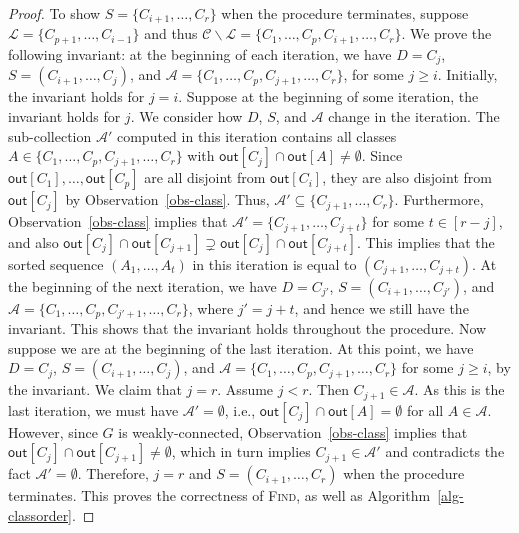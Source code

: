 \documentclass[11pt]{article}
\begin{document}
\begin{proof}
To show $S = \{C_{i+1},\dots,C_r\}$ when the procedure terminates, suppose $\mathcal{L} = \{C_{p+1},\dots,C_{i-1}\}$ and thus $\mathcal{C} \backslash \mathcal{L} = \{C_1,\dots,C_p,C_{i+1},\dots,C_r\}$.
We prove the following invariant: at the beginning of each iteration, we have $D = C_j$, $S = (C_{i+1},\dots,C_j)$, and $\mathcal{A} = \{C_1,\dots,C_p,C_{j+1},\dots,C_r\}$, for some $j \geq i$.
Initially, the invariant holds for $j = i$.
Suppose at the beginning of some iteration, the invariant holds for $j$.
We consider how $D$, $S$, and $\mathcal{A}$ change in the iteration.
The sub-collection $\mathcal{A}'$ computed in this iteration contains all classes $A \in \{C_1,\dots,C_p,C_{j+1},\dots,C_r\}$ with $\mathsf{out}[C_j] \cap \mathsf{out}[A] \neq \emptyset$.
Since $\mathsf{out}[C_1],\dots,\mathsf{out}[C_p]$ are all disjoint from $\mathsf{out}[C_i]$, they are also disjoint from $\mathsf{out}[C_j]$ by Observation~\ref{obs-class}.
Thus, $\mathcal{A}' \subseteq \{C_{j+1},\dots,C_r\}$.
Furthermore, Observation~\ref{obs-class} implies that $\mathcal{A}' = \{C_{j+1},\dots,C_{j+t}\}$ for some $t \in [r-j]$, and also $\mathsf{out}[C_j] \cap \mathsf{out}[C_{j+1}] \supsetneq \mathsf{out}[C_j] \cap \mathsf{out}[C_{j+t}]$.
This implies that the sorted sequence $(A_1,\dots,A_t)$ in this iteration is equal to $(C_{j+1},\dots,C_{j+t})$.
At the beginning of the next iteration, we have $D = C_{j'}$, $S = (C_{i+1},\dots,C_{j'})$, and $\mathcal{A} = \{C_1,\dots,C_p,C_{j'+1},\dots,C_r\}$, where $j' = j+t$, and hence we still have the invariant.
This shows that the invariant holds throughout the procedure.
Now suppose we are at the beginning of the last iteration.
At this point, we have $D = C_j$, $S = (C_{i+1},\dots,C_j)$, and $\mathcal{A} = \{C_1,\dots,C_p,C_{j+1},\dots,C_r\}$ for some $j \geq i$, by the invariant.
We claim that $j = r$.
Assume $j < r$.
Then $C_{j+1} \in \mathcal{A}$.
As this is the last iteration, we must have $\mathcal{A}' = \emptyset$, i.e., $\mathsf{out}[C_j] \cap \mathsf{out}[A] = \emptyset$ for all $A \in \mathcal{A}$.
However, since $G$ is weakly-connected, Observation~\ref{obs-class} implies that $\mathsf{out}[C_j] \cap \mathsf{out}[C_{j+1}] \neq \emptyset$, which in turn implies $C_{j+1} \in \mathcal{A}'$ and contradicts the fact $\mathcal{A}' = \emptyset$.
Therefore, $j = r$ and $S = (C_{i+1},\dots,C_r)$ when the procedure terminates.
This proves the correctness of \textsc{Find}, as well as Algorithm~\ref{alg-classorder}.


\end{proof}
\end{document}
